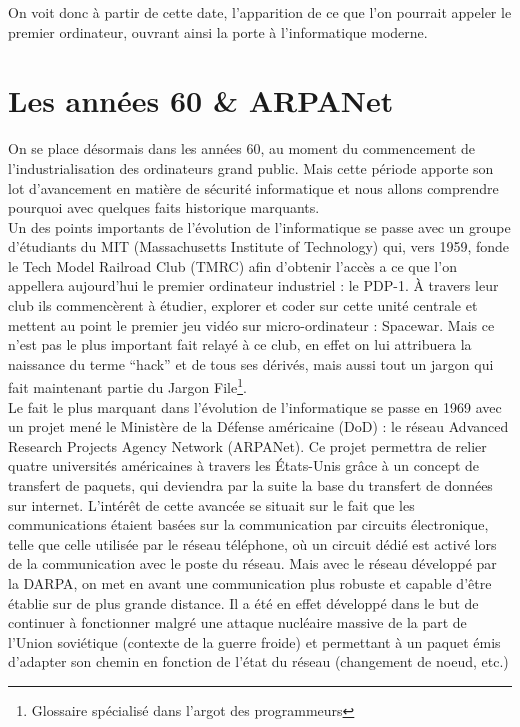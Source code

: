 \documentclass[a4paper]{memoir}
\begin{document}
On voit donc à partir de cette date, l'apparition de ce que l'on pourrait appeler le premier ordinateur, ouvrant ainsi la porte à l'informatique moderne.

\section{Les années 60 \& ARPANet}

On se place désormais dans les années 60, au moment du commencement de l'industrialisation des ordinateurs grand public. Mais cette période apporte son lot d'avancement en matière de sécurité informatique et nous allons comprendre pourquoi avec quelques faits historique marquants.\\

Un des points importants de l'évolution de l'informatique se passe avec un groupe d'étudiants du MIT (Massachusetts Institute of Technology) qui, vers 1959, fonde le Tech Model Railroad Club (TMRC) afin d'obtenir l'accès a ce que l'on appellera aujourd'hui le premier ordinateur industriel : le PDP-1. À travers leur club ils commencèrent à étudier, explorer et coder sur cette unité centrale et mettent au point le premier jeu vidéo sur micro-ordinateur : Spacewar. Mais ce n'est pas le plus important fait relayé à ce club, en effet on lui attribuera la naissance du terme ``hack'' et de tous ses dérivés, mais aussi tout un jargon qui fait maintenant partie du Jargon File\footnote{Glossaire spécialisé dans l'argot des programmeurs}.\\

Le fait le plus marquant dans l'évolution de l'informatique se passe en 1969 avec un projet mené le Ministère de la Défense américaine (DoD) : le réseau Advanced Research Projects Agency Network (ARPANet). Ce projet permettra de relier quatre universités américaines à travers les États-Unis grâce à un concept de transfert de paquets, qui deviendra par la suite la base du transfert de données sur internet. L'intérêt de cette avancée se situait sur le fait que les communications étaient basées sur la communication par circuits électronique, telle que celle utilisée par le réseau téléphone, où un circuit dédié est activé lors de la communication avec le poste du réseau. Mais avec le réseau développé par la DARPA, on met en avant une communication plus robuste et capable d'être établie sur de plus grande distance. Il a été en effet développé dans le but de continuer à fonctionner malgré une attaque nucléaire massive de la part de l'Union soviétique (contexte de la guerre froide) et permettant à un paquet émis d'adapter son chemin en fonction de l'état du réseau (changement de noeud, etc.)
\end{document}
